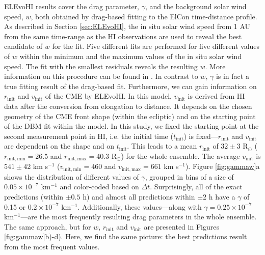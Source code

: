 \documentclass[draft]{agujournal}
\begin{document}
ELEvoHI results cover the drag parameter, $\gamma$, and the background solar wind speed, $w$, both obtained by drag-based fitting to the ElCon time-distance profile. As described in Section \ref{sec:ELEvoHI}, the in situ solar wind speed from 1 AU from the same time-range as the HI observations are used to reveal the best candidate of $w$ for the fit. Five different fits are performed for five different values of $w$ within the minimum and the maximum values of the in situ solar wind speed. The fit with the smallest residuals reveals the resulting $w$. More information on this procedure can be found in \citet{rol16}. In contrast to $w$, $\gamma$ is in fact a true fitting result of the drag-based fit. Furthermore, we can gain information on $r_{\mathrm{init}}$ and $v_{\mathrm{init}}$ of the CME by ELEvoHI. In this model, $v_{\mathrm{init}}$ is derived from HI data after the conversion from elongation to distance. It depends on the chosen geometry of the CME front shape (within the ecliptic) and on the starting point of the DBM fit within the model. In this study, we fixed the starting point at the second measurement point in HI, i.e. the initial time ($t_{\mathrm{init}}$) is fixed---$r_{\mathrm{init}}$ and $v_{\mathrm{init}}$ are dependent on the shape and on $t_{\mathrm{init}}$.
This leads to a mean $r_{\mathrm{init}}$ of $32 \pm $3 R$_\odot$ ($r_{\mathrm{init, min}}=26.5$ and $r_{\mathrm{init, max}}=40.3$ R$_\odot$) for the whole ensemble.
The average $v_{\mathrm{init}}$ is $541 \pm 4$2 km s$^{-1}$ ($v_{\mathrm{init, min}}=460$ and $v_{\mathrm{init, max}}=661$ km s$^{-1}$).
Figure \ref{fig:gammaw}a shows the distribution of different values of $\gamma$, grouped in bins of a size of $0.05 \times 10^{-7}$ km$^{-1}$ and color-coded based on $\Delta t$. Surprisingly, all of the exact predictions (within $\pm 0.5$ h) and almost all predictions within $\pm 2$ h have a $\gamma$ of 0.15 or $0.2 \times 10^{-7}$ km$^{-1}$. Additionally, these values---along with $\gamma=0.25 \times 10^{-7}$ km$^{-1}$---are the most frequently resulting drag parameters in the whole ensemble. The same approach, but for $w$, $r_{\mathrm{init}}$ and $v_{\mathrm{init}}$ are presented in Figures \ref{fig:gammaw}b)-d). Here, we find the same picture: the best predictions result from the most frequent values. 
\end{document}
